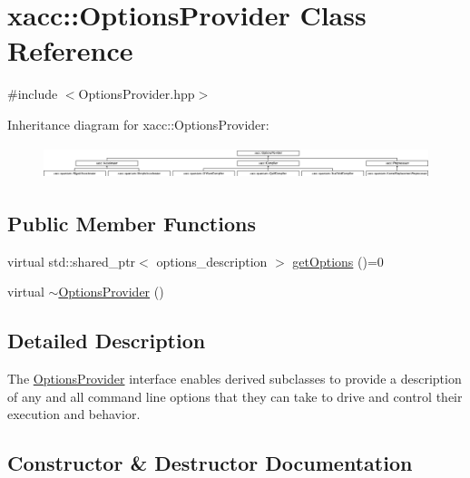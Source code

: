 \hypertarget{a01195}{}\section{xacc\+:\+:Options\+Provider Class Reference}
\label{a01195}


{\ttfamily \#include $<$Options\+Provider.\+hpp$>$}

Inheritance diagram for xacc\+:\+:Options\+Provider\+:\begin{figure}[H]
\begin{center}
\leavevmode
\includegraphics[height=0.962199cm]{a01195}
\end{center}
\end{figure}
\subsection*{Public Member Functions}
\begin{DoxyCompactItemize}
\item 
virtual std\+::shared\+\_\+ptr$<$ options\+\_\+description $>$ \hyperlink{a01195_a6d150954f852109bfe2c1ae90222926f}{get\+Options} ()=0
\item 
virtual \hyperlink{a01195_a7782757b419792ff346f563517eed8b8}{$\sim$\+Options\+Provider} ()
\end{DoxyCompactItemize}


\subsection{Detailed Description}
The \hyperlink{a01195}{Options\+Provider} interface enables derived subclasses to provide a description of any and all command line options that they can take to drive and control their execution and behavior. 

\subsection{Constructor \& Destructor Documentation}
\mbox{\label{a01195_a7782757b419792ff346f563517eed8b8}} 
